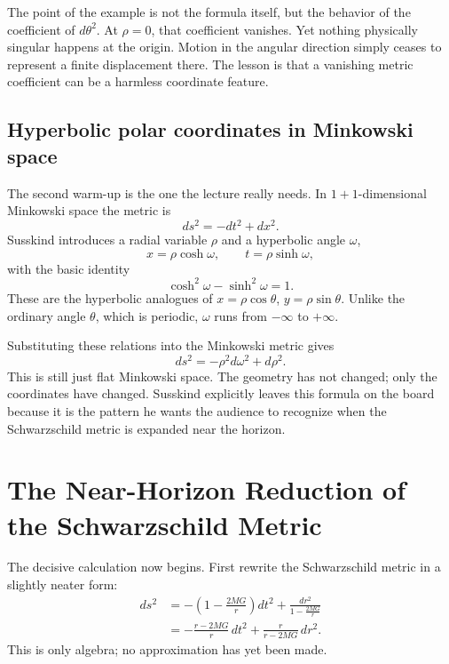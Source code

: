 The point of the example is not the formula itself, but the behavior of the coefficient of \(d\theta^2\). At \(\rho=0\), that coefficient vanishes. Yet nothing physically singular happens at the origin. Motion in the angular direction simply ceases to represent a finite displacement there. The lesson is that a vanishing metric coefficient can be a harmless coordinate feature.

\subsection{Hyperbolic polar coordinates in Minkowski space}

The second warm-up is the one the lecture really needs. In \(1+1\)-dimensional Minkowski space the metric is
\begin{equation}
ds^2 = -dt^2 + dx^2.
\end{equation}
Susskind introduces a radial variable \(\rho\) and a hyperbolic angle \(\omega\),
\begin{equation}
x=\rho\cosh\omega,
\qquad
t=\rho\sinh\omega,
\end{equation}
with the basic identity
\begin{equation}
\cosh^2\omega-\sinh^2\omega = 1.
\end{equation}
These are the hyperbolic analogues of \(x=\rho\cos\theta\), \(y=\rho\sin\theta\). Unlike the ordinary angle \(\theta\), which is periodic, \(\omega\) runs from \(-\infty\) to \(+\infty\).

Substituting these relations into the Minkowski metric gives
\begin{equation}
ds^2 = -\rho^2 d\omega^2 + d\rho^2.
\end{equation}
This is still just flat Minkowski space. The geometry has not changed; only the coordinates have changed. Susskind explicitly leaves this formula on the board because it is the pattern he wants the audience to recognize when the Schwarzschild metric is expanded near the horizon.

\section{The Near-Horizon Reduction of the Schwarzschild Metric}

The decisive calculation now begins. First rewrite the Schwarzschild metric in a slightly neater form:
\begin{align}
ds^2
&= -\left(1-\frac{2MG}{r}\right)dt^2 + \frac{dr^2}{1-\frac{2MG}{r}} \\
&= -\frac{r-2MG}{r}\,dt^2 + \frac{r}{r-2MG}\,dr^2.
\end{align}
This is only algebra; no approximation has yet been made.

